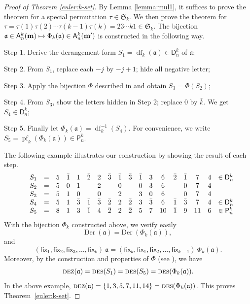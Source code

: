 \documentclass[12pt]{amsart} %
\numberwithin{equation}{section}
\theoremstyle{plain}
\theoremstyle{definition}
\newcommand\A{\mathsf{A}}
\renewcommand\P{\mathsf{P}}
\newcommand\D{\mathsf{D}}
\def\Der{\mathrm{Der}}
\def\DES{\hbox{\rm\textsc{des}}}
\def\DEZ{\hbox{\rm\textsc{dez}}}
\def\fix{\mathsf{fix}}
\def\S{\mathfrak{S}}
\def\a{\mathfrak{a}}
\def\df{\operatorname{df}}
\def\pf{\operatorname{pf}}
\def\neg#1{{{{\bar#1}}}}
\begin{document}
\begin{proof}[Proof of Theorem \ref{euler:k-set}]
By Lemma \ref{lemma:mul1}, it suffices to prove the theorem for a special permutation $\tau\in\S_k$.
We then prove the theorem for $\tau=\tau(1)\tau(2)\cdots\tau(k-1)\tau(k)=2 3 \cdots k 1\in \S_k$.
%
The bijection $\a \in \A_n^k({\bf m}) \mapsto \Phi_k(\a) \in \A_n^k({\bf m'})$ is constructed  in the following way.

Step 1. Derive the derangement form $S_1 = \df_k(\a)\in \D_n^k$ of $\a$;

Step 2. From $S_1$, replace each $-j$ by $-j+1$;  hide all negative letter; 

Step 3. Apply the bijection $\Phi$ described in \cite[Section 2]{fh1} and obtain $S_3=\Phi(S_2)$;

Step 4. From $S_3$, show the letters hidden in Step 2; replace $0$ by $\neg k$.
We get $S_4 \in \D_n^k$;

Step 5. Finally let $\Phi_k(\a)=\df_k^{-1}(S_4)$. For convenience, we write $S_5=\pf_k(\Phi_k(\a))\in \P_n^k$.


\noindent
The following example illustrates our construction by showing the result of each step.
\medskip
$$
\begin{array}{c c c  c c c c c c c c c c c c c c c c c c c c c}
	&S_1 &=&5&\bar 1&1&\bar 2&2 &\bar3    &\bar 1&\bar 3&\bar 1&3&6&\bar 2&\bar 1&7&4 & \in \D_n^k\\
	&S_2 &=&5&0&1&&2   & &0&&0&3&6&&0&7&4 &\\
	&S_3 &=&5&1&0&&0   & &2&&3&0&6&&0&7&4 & \\
	&S_4 &=&5&1&\bar 3&\bar 1&\bar 3   & \bar2&2&\bar 2&3&\bar 3&6&\bar 1&\bar 3&7&4 & \in \D_n^k\\
	&	S_5 &=&8&1& 3&\bar 1 &4   & \bar 2 &2&\bar2 &5&7&10&\bar1&9&11&6 & \in \P_n^k\\
\end{array}
$$
With the bijection $\Phi_k$ constructed above, we verify easily 
\begin{equation*}
	\Der~(\a) = \Der~(\Phi_k(\a)),
\end{equation*}
and
	\begin{equation}\label{eq:mulchange}
	(\fix_1, \fix_2, \fix_3, \ldots, \fix_k)~\a 
	= (\fix_k,\fix_1,\fix_2, \ldots, \fix_{k-1} )~\Phi_k(\a).
\end{equation}
Moreover, by the construction and properties of $\Phi$ (see \cite[Thm.~1.1]{fh1}), we have
\begin{equation*}
	\DEZ(\a) = \DES(S_1)=  \DES(S_5)= \DES(\Phi_k(\a)).
\end{equation*}
In the above example, 
$	\DEZ(\a) = \{1,3,5,7,11,14\}= \DES(\Phi_k(\a))$.
This proves Theorem~\ref{euler:k-set}.
\end{proof}
\end{document}
